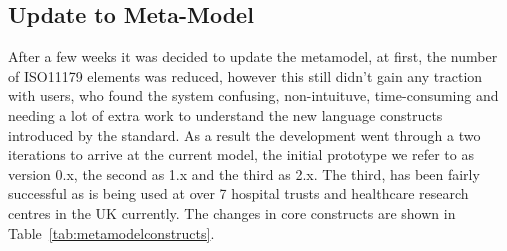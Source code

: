 \documentclass[runningheads]{llncs}
\begin{document}
	\subsection{Update to Meta-Model}
	After a few weeks it was decided to update the metamodel, at first, the number of ISO11179 elements was reduced, however this still didn't gain any traction with users, who found the system confusing, non-intuituve, time-consuming and needing a lot of extra work to understand the new language constructs introduced by the standard. As a result the development went through a two iterations to arrive at the current model, the initial prototype we refer to as version 0.x, the second as 1.x and the third as 2.x. The third, has been fairly successful as is being used at over 7 hospital trusts and healthcare research centres in the UK currently. The changes in core constructs are shown in Table~\ref{tab:metamodelconstructs}.
	
\end{document}

